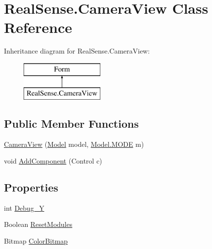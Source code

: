 \hypertarget{class_real_sense_1_1_camera_view}{}\section{Real\+Sense.\+Camera\+View Class Reference}
\label{class_real_sense_1_1_camera_view}
Inheritance diagram for Real\+Sense.\+Camera\+View\+:\begin{figure}[H]
\begin{center}
\leavevmode
\includegraphics[height=2.000000cm]{class_real_sense_1_1_camera_view}
\end{center}
\end{figure}
\subsection*{Public Member Functions}
\begin{DoxyCompactItemize}
\item 
\hyperlink{class_real_sense_1_1_camera_view_ac7f93adbed37d386412a051e6f93f978}{Camera\+View} (\hyperlink{class_real_sense_1_1_model}{Model} model, \hyperlink{class_real_sense_1_1_model_ace9541c050b75cb23582ce01ac892190}{Model.\+M\+O\+DE} m)
\item 
void \hyperlink{class_real_sense_1_1_camera_view_a67c8ee2cdbf0caf43e48043d90c0d549}{Add\+Component} (Control c)
\end{DoxyCompactItemize}
\subsection*{Properties}
\begin{DoxyCompactItemize}
\item 
int \hyperlink{class_real_sense_1_1_camera_view_a5cc5cea08df7b36da52efba2a166e361}{Debug\+\_\+Y}
\item 
Boolean \hyperlink{class_real_sense_1_1_camera_view_a342611e6157bb18b9c097186b3b9bee0}{Reset\+Modules}
\item 
Bitmap \hyperlink{class_real_sense_1_1_camera_view_a487ce7be920e8f6742d704d97a6057dc}{Color\+Bitmap}
\end{DoxyCompactItemize}


